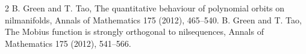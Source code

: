 \documentclass[11pt]{article}
\begin{document}


\begin{thebibliography}{2}
 B. Green and T. Tao,
The quantitative behaviour of polynomial orbits on nilmanifolds,
Annals of Mathematics 175 (2012), 465--540.
 B. Green and T. Tao,
The Mobius function is strongly orthogonal to nilsequences,
Annals of Mathematics 175 (2012), 541--566.
\end{thebibliography}
\end{document}
